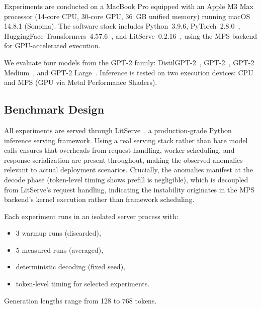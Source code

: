 \documentclass{article}
\begin{document}
Experiments are conducted on a MacBook Pro equipped with an Apple M3 Max processor (14-core CPU, 30-core GPU, 36~GB unified memory) running macOS 14.8.1 (Sonoma). The software stack includes Python~3.9.6, PyTorch~2.8.0~\cite{paszke2019pytorch}, HuggingFace Transformers~4.57.6~\cite{wolf2020transformers}, and LitServe~0.2.16~\cite{lightningai2026litserve}, using the MPS backend for GPU-accelerated execution.

We evaluate four models from the GPT-2 family: DistilGPT-2~\cite{sanh2019distilbert}, GPT-2~\cite{radford2019gpt2}, GPT-2 Medium~\cite{radford2019gpt2}, and GPT-2 Large~\cite{radford2019gpt2}. Inference is tested on two execution devices: CPU and MPS (GPU via Metal Performance Shaders).

\subsection{Benchmark Design}

All experiments are served through LitServe~\cite{lightningai2026litserve}, a production-grade Python inference serving framework.
Using a real serving stack rather than bare model calls ensures that overheads from request handling, worker scheduling, and response serialization are present throughout, making the observed anomalies relevant to actual deployment scenarios.
Crucially, the anomalies manifest at the decode phase (token-level timing shows prefill is negligible), which is decoupled from LitServe's request handling, indicating the instability originates in the MPS backend's kernel execution rather than framework scheduling.

Each experiment runs in an isolated server process with:
\begin{itemize}
\item 3 warmup runs (discarded),
\item 5 measured runs (averaged),
\item deterministic decoding (fixed seed),
\item token-level timing for selected experiments.
\end{itemize}

Generation lengths range from 128 to 768 tokens.
\end{document}
